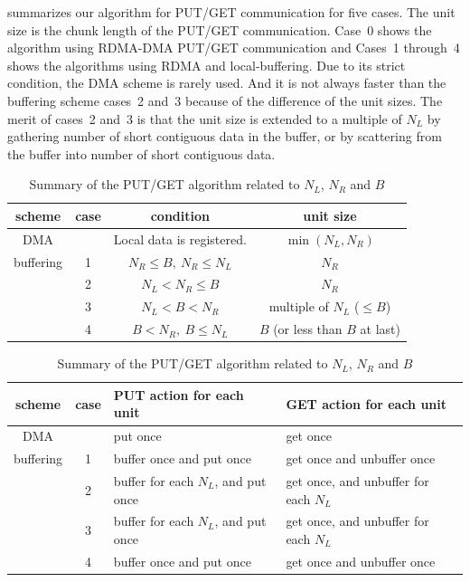  summarizes our algorithm for PUT/GET communication for five cases.
The unit size is the chunk length of the PUT/GET communication.
Case~0 shows the algorithm using RDMA-DMA PUT/GET communication and Cases~1 through~4
shows the algorithms using RDMA and local-buffering. 
Due to its strict condition, the DMA scheme is rarely used.
And it is not always faster than the buffering scheme cases~2 and~3 because of the 
difference of the unit sizes. The merit of cases~2 and~3 is that the unit size 
is extended to a multiple of $N_L$ by gathering number of short contiguous data in the buffer,
or by scattering from the buffer into number of short contiguous data.

\begin{table}[tbh]
 \caption{Summary of the PUT/GET algorithm related to $N_L$, $N_R$ and $B$}
 \label{tab:putget}
 \begin{flushleft}
  \begin{tabular}{|@{~}c@{~}|c||@{~}c@{~}|@{~}c@{~}|}
\hline
scheme &
case &
condition &
unit size \\
\hline
\hline
DMA &
&
Local data is registered. &
$\min(N_L, N_R)$ \\
\hline
buffering &
1 & 
$N_R \leq B,~ N_R \leq N_L$ &
$N_R$ \\
\cline{2-4}
&
2 &
$N_L < N_R \leq B$ &
$N_R$ \\
\cline{2-4}
&
3 &
$N_L < B < N_R$ &
multiple of $N_L$ ($\leq B$) \\
\cline{2-4}
&
4 &
$B < N_R,~ B \leq N_L$ &
$B$ (or less than $B$ at last) \\
\hline
  \end{tabular}
 \end{flushleft}
 \begin{flushleft}
  \begin{tabular}{|@{~}c@{~}|c||@{~~}l@{~~}|@{~~}l@{~~}|}
\hline
scheme &
case &
PUT action for each unit &
GET action for each unit \\
\hline
\hline
DMA &
&
put once &
get once \\
\hline
buffering &
1 &
buffer once and put once &
get once and unbuffer once \\
\cline{2-4}
&
2 &
buffer for each $N_L$, and put once &
get once, and unbuffer for each $N_L$ \\
\cline{2-4}
&
3 &
buffer for each $N_L$, and put once &
get once, and unbuffer for each $N_L$ \\
\cline{2-4}
&
4 &
buffer once and put once &
get once and unbuffer once \\
\hline
  \end{tabular}
 \end{flushleft}
\end{table}


